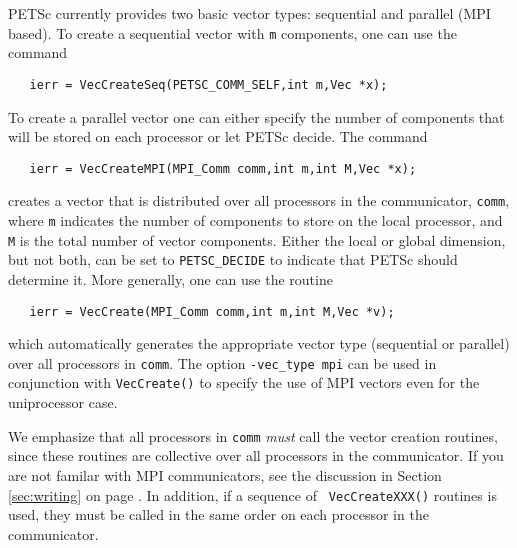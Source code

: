 PETSc currently provides two basic vector types: sequential and parallel
(MPI based). To create a sequential vector with {\tt m} components,
one can
use the command  
\begin{verbatim}
   ierr = VecCreateSeq(PETSC_COMM_SELF,int m,Vec *x);
\end{verbatim}
To create a parallel vector one can either specify the number of 
components that will be stored on each processor or let PETSc decide. 
The command 
\begin{verbatim}
   ierr = VecCreateMPI(MPI_Comm comm,int m,int M,Vec *x);
\end{verbatim}
creates a vector that is distributed over all processors in the communicator,
{\tt comm}, where {\tt m} indicates the number 
of components to store on the local processor, and {\tt M} is the 
total number of vector components.  Either the local or global 
dimension, but not both, can be set to {\tt PETSC\_DECIDE} to 
 indicate that PETSc should determine it.
More generally, one can use the routine 
\begin{verbatim}
   ierr = VecCreate(MPI_Comm comm,int m,int M,Vec *v);
\end{verbatim}
which automatically generates the appropriate vector type 
(sequential or parallel) over all processors in {\tt comm}.
The option {\tt -vec\_type mpi} can be used in conjunction with 
{\tt VecCreate()} to specify the use of MPI 
vectors even for the uniprocessor case.

We emphasize that all processors in {\tt comm} {\em must} call the
vector creation routines, since these routines are collective over all
processors in the communicator. If you are not familar with MPI communicators,
see the discussion in Section \ref{sec:writing} on page \pageref{sec:writing}. 
In addition, if a sequence of {\tt
VecCreateXXX()} routines is used, they must be called in the same
order on each processor in the communicator.

